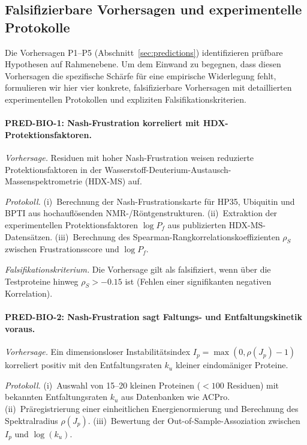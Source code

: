 \documentclass[12pt,a4paper]{article}
\theoremstyle{remark}
\begin{document}
\subsection{Falsifizierbare Vorhersagen und experimentelle Protokolle}
\label{sec:falsifiable-predictions}

Die Vorhersagen P1--P5 (Abschnitt~\ref{sec:predictions}) identifizieren prüfbare Hypothesen auf Rahmenebene. Um dem Einwand zu begegnen, dass diesen Vorhersagen die spezifische Schärfe für eine empirische Widerlegung fehlt, formulieren wir hier vier konkrete, falsifizierbare Vorhersagen mit detaillierten experimentellen Protokollen und expliziten Falsifikationskriterien.

\paragraph{PRED-BIO-1: Nash-Frustration korreliert mit HDX-Protektionsfaktoren.}

\textit{Vorhersage.}
Residuen mit hoher Nash-Frustration weisen reduzierte Protektionsfaktoren in der Wasserstoff-Deuterium-Austausch-Massenspektrometrie (HDX-MS) auf.

\textit{Protokoll.}
(i)~Berechnung der Nash-Frustrationskarte für HP35, Ubiquitin und BPTI aus hochauflösenden NMR-/Röntgenstrukturen.
(ii)~Extraktion der experimentellen Protektionsfaktoren $\log P_f$ aus publizierten HDX-MS-Datensätzen.
(iii)~Berechnung des Spearman-Rangkorrelationskoeffizienten $\rho_S$ zwischen Frustrationsscore und $\log P_f$.

\textit{Falsifikationskriterium.}
Die Vorhersage gilt als falsifiziert, wenn über die Testproteine hinweg $\rho_S > -0.15$ ist (Fehlen einer signifikanten negativen Korrelation).

\paragraph{PRED-BIO-2: Nash-Frustration sagt Faltungs- und Entfaltungskinetik voraus.}

\textit{Vorhersage.}
Ein dimensionsloser Instabilitätsindex $I_p = \max(0, \rho(J_p) - 1)$ korreliert positiv mit den Entfaltungsraten $k_u$ kleiner eindomäniger Proteine.

\textit{Protokoll.}
(i)~Auswahl von 15--20 kleinen Proteinen ($< 100$ Residuen) mit bekannten Entfaltungsraten $k_u$ aus Datenbanken wie ACPro.
(ii)~Präregistrierung einer einheitlichen Energienormierung und Berechnung des Spektralradius $\rho(J_p)$.
(iii)~Bewertung der Out-of-Sample-Assoziation zwischen $I_p$ und $\log(k_u)$.
\end{document}
